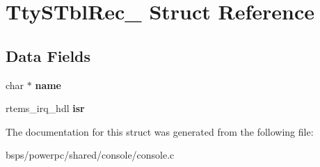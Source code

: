 \hypertarget{structTtySTblRec__}{}\section{Tty\+S\+Tbl\+Rec\+\_\+ Struct Reference}
\label{structTtySTblRec__}
\subsection*{Data Fields}
\begin{DoxyCompactItemize}
\item 
\mbox{\label{structTtySTblRec___a22693cbfba1a1339d6bae92382b53072}} 
char $\ast$ {\bfseries name}
\item 
\mbox{\label{structTtySTblRec___a22e684857e220ec4be2b77fbcb8707a2}} 
rtems\+\_\+irq\+\_\+hdl {\bfseries isr}
\end{DoxyCompactItemize}


The documentation for this struct was generated from the following file\+:\begin{DoxyCompactItemize}
\item 
bsps/powerpc/shared/console/console.\+c\end{DoxyCompactItemize}
